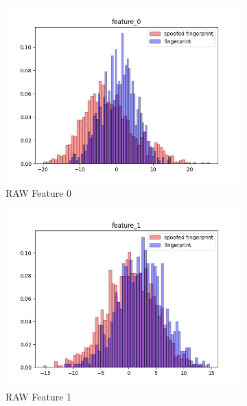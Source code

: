 \documentclass[english]{report}
\begin{document}
\begin{figure}[h!]
    \begin{subfigure}{0.3\textwidth}
        \includegraphics[scale=0.3]{../../images/feature_plot/hist_feature_0}
        \caption{RAW Feature 0}
    \end{subfigure}
    \begin{subfigure}{0.3\textwidth}
        \includegraphics[scale=0.3]{../../images/feature_plot/hist_feature_1}
        \caption{RAW Feature 1}
    \end{subfigure}
    \begin{subfigure}{0.3\textwidth}

\end{subfigure}
\end{figure}
\end{document}
